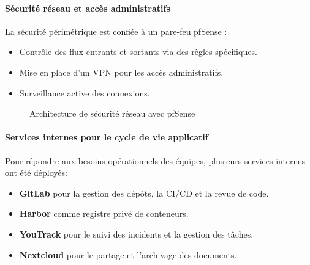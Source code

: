 {\paragraph{\textbf{Sécurité réseau et accès administratifs}}

La sécurité périmétrique est confiée à un pare-feu pfSense :
\begin{itemize}
	\item Contrôle des flux entrants et sortants via des règles spécifiques.
	\item Mise en place d’un VPN pour les accès administratifs.
	\item Surveillance active des connexions.
\end{itemize}

\begin{figure}[H]
	\centering
	\caption{Architecture de sécurité réseau avec pfSense}
\end{figure}

\paragraph{\textbf{Services internes pour le cycle de vie applicatif}}

Pour répondre aux besoins opérationnels des équipes, plusieurs services internes ont été déployés:
\begin{itemize}
	\item \textbf{GitLab} pour la gestion des dépôts, la CI/CD et la revue de code.
	\item \textbf{Harbor} comme registre privé de conteneurs.
	\item \textbf{YouTrack} pour le suivi des incidents et la gestion des tâches.
	\item \textbf{Nextcloud} pour le partage et l’archivage des documents.
\end{itemize}

}
